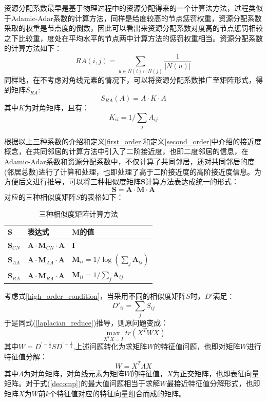 资源分配系数最早是基于物理过程中的资源分配得来的一个计算法方法，过程类似于Adamic-Adar系数的计算方法，同样是给度较高的节点惩罚权重，资源分配系数采取的权重是节点度的倒数，因此可以看出来资源分配系数对度高的节点惩罚相较之下比较重，度处在平均水平的节点两中计算方法的惩罚权重相当。资源分配系数的计算方法如下：
\begin{equation}
	RA(i,j) =  \sum_{u \in N(i)\cap N(j)} \frac{1}{|N(u)|}
\end{equation}
同样地，在不考虑对角线元素的情况下，可以将资源分配系数推广至矩阵形式，得到矩阵$S_{RA}$:
\begin{equation}
	S_{RA}(A) = A\cdot K \cdot A
\end{equation}
其中$K$为对角矩阵，且有：
\begin{equation}
	K_{ii} = 1/\sum_jA_{ij}
\end{equation} 

根据以上三种系数的介绍和定义\ref{first_order}和定义\ref{second_order}中介绍的接近度概念，在共同邻居的计算方法中引入了二阶接近度，也即二度邻居的信息，在Adamic-Adar系数和资源分配系数中，不仅计算了共同邻居，还对共同邻居的度(邻居总数)进行了计算和处理，也即处理了高于二阶接近度的高阶接近度信息。为方便后文进行推导，可以将三种相似度矩阵$\textbf{S}$计算方法表达成统一的形式：
\begin{equation}\label{unify}
	\textbf{S} = \textbf{A} \cdot \textbf{M} \cdot \textbf{A}
\end{equation}
对应的三种相似度矩阵$S$的表格如下：
\begin{table}
	\centering
	\caption{三种相似度矩阵计算方法}
	\begin{tabular}{|C{1.0in}|C{1.8in}|C{1.8in}|}
		\hline
		$\textbf{S}$ & 表达式 & $\textbf{M}$的值  \\ \hline\hline
		$\textbf{S}_{CN}$ & $\textbf{A}\cdot \textbf{M}_{CN} \cdot\textbf{A}$ & $\textbf{I}$  \\ \hline
		$\textbf{S}_{AA}$ & $\textbf{A}\cdot \textbf{M}_{AA}\cdot \textbf{A}$ & $\textbf{M}_{ii} = 1/\log(\sum_j{\textbf{A}_{ij}})$ \\ \hline
		$\textbf{S}_{RA}$ & $\textbf{A}\cdot \textbf{M}_{RA}\cdot \textbf{A}$ & $\textbf{M}_{ii} = 1/\sum_j\textbf{A}_{ij}$ \\ \hline
	\end{tabular}
\end{table}

考虑式\ref{high_order_condition}，当采用不同的相似度矩阵$S$时，$D'$满足：
\begin{equation}
D'_{ii} = \sum_j{S_{ij}}
\end{equation}
于是同式(\ref{laplacian_reduce})推导，则原问题变成：
\begin{equation}\label{decomp}
\max_{X^TX = I} tr(X^TWX)
\end{equation}
其中$W = D^{\prime-\frac{1}{2}}SD^{\prime-\frac{1}{2}}$,上述问题转化为求矩阵$W$的特征值问题，也即对矩阵$W$进行特征值分解：
\begin{equation}\label{evol}
	W = X^T \Lambda X 
\end{equation}
其中$\Lambda$为对角矩阵，对角线元素为矩阵$W$的特征值，$X$为正交矩阵，也即表征向量矩阵。对于式(\ref{decomp})的最大值问题相当于求解$W$最接近特征值分解形式，也即矩阵$X$为$W$前$k$个特征值对应的特征向量组合而成的矩阵。

